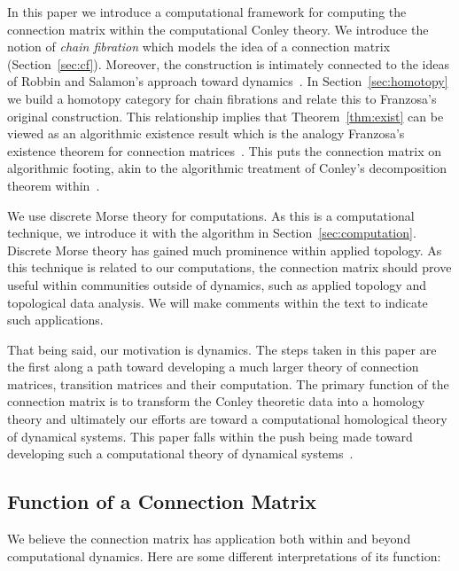In this paper we introduce a computational framework for computing the connection matrix within the computational Conley theory.  We introduce the notion of {\em chain fibration} which models the idea of a connection matrix (Section~\ref{sec:cf}).  Moreover, the construction is intimately connected to the ideas of Robbin and Salamon's approach toward dynamics~\cite{salamon}.  In Section~\ref{sec:homotopy} we build a homotopy category for chain fibrations and relate this to Franzosa's original construction.  This relationship implies that Theorem~\ref{thm:exist} can be viewed as an algorithmic existence result which is the analogy Franzosa's existence theorem for connection matrices~\cite[Theorem 3.8]{fran}.   This puts the connection matrix on algorithmic footing, akin to the algorithmic treatment of Conley's decomposition theorem within~\cite{kmv}.

We use discrete Morse theory for computations.  As this is a computational technique, we introduce it with the algorithm in Section~\ref{sec:computation}.  Discrete Morse theory has gained much prominence within applied topology.  As this technique is related to our computations, the connection matrix should prove useful within communities outside of dynamics, such as applied topology and topological data analysis.  We will make comments within the text to indicate such applications.

 That being said, our motivation is dynamics.  The steps taken in this paper are the first along a path toward developing a much larger theory of connection matrices, transition matrices and their computation.  The primary function of the connection matrix is to transform the Conley theoretic data into a homology theory and ultimately our efforts are toward a computational homological theory of dynamical systems.  This paper falls within the push being made toward developing such a computational theory of dynamical systems~\cite{cmdbProject,dsgrnProject}.  

\subsection{Function of a Connection Matrix}

We believe the connection matrix has application both within and beyond computational dynamics.  Here are some different interpretations of its function:

